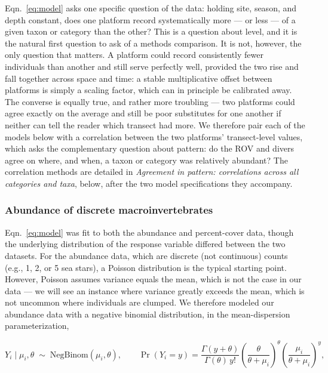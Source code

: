 \documentclass[11pt]{article}
\begin{document}
Eqn.~\ref{eq:model} asks one specific question of the data: holding site,
season, and depth constant, does one platform record systematically more ---
or less --- of a given taxon or category than the other?
This is a question about level, and it is the natural first question to
ask of a methods comparison.
It is not, however, the only question that matters.
A platform could record consistently fewer individuals than another and still
serve perfectly well, provided the two rise and fall together across space and
time: a stable multiplicative offset between platforms is simply a scaling factor,
which can in principle be calibrated away.
The converse is equally true, and rather more troubling --- two platforms
could agree exactly on the average and still be poor substitutes for one
another if neither can tell the reader which transect had more.
We therefore pair each of the models below with a correlation between the two
platforms' transect-level values, which asks the complementary question about
pattern: do the ROV and divers agree on where, and when, a taxon or
category was relatively abundant?
The correlation methods are detailed in \textit{Agreement in pattern:
correlations across all categories and taxa}, below, after the two model
specifications they accompany.

\subsubsection{Abundance of discrete macroinvertebrates}
\label{subsubsec:abundance}

Eqn.~\ref{eq:model} was fit to both the abundance and percent-cover data,
though the underlying distribution of the response variable differed between
the two datasets.
For the abundance data, which are discrete (not continuous) counts (e.g., 1, 2,
or 5 sea stars), a Poisson distribution is the typical starting point.
However, Poisson assumes variance equals the mean, which is not the case in
our data --- we will see an instance where variance greatly exceeds the mean,
which is not uncommon where individuals are clumped.
We therefore modeled our abundance data with a negative binomial distribution,
in the mean-dispersion parameterization,

\begin{equation}
Y_i \mid \mu_i, \theta
\;\sim\;
\mathrm{NegBinom}(\mu_i, \theta),
\qquad
\Pr(Y_i = y)
=
\frac{\Gamma(y + \theta)}{\Gamma(\theta)\, y!}
\left( \frac{\theta}{\theta + \mu_i} \right)^{\theta}
\left( \frac{\mu_i}{\theta + \mu_i} \right)^{y},
\label{eq:negbinom}
\end{equation}
\end{document}
